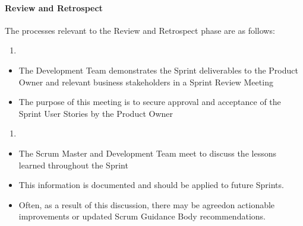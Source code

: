 \documentclass[letterpaper,10pt,english]{jupyterBook}
\begin{document}
\paragraph{Review and Retrospect}
\label{\detokenize{APM/sbok:review-and-retrospect}}
\sphinxAtStartPar
The processes relevant to the Review and Retrospect phase are as follows:
\begin{enumerate}
%
\item {} 
\sphinxAtStartPar
{}

\end{enumerate}
\begin{itemize}
\item {} 
\sphinxAtStartPar
The Development Team demonstrates the Sprint deliverables to the Product Owner and relevant business stakeholders in a Sprint Review Meeting

\item {} 
\sphinxAtStartPar
The purpose of this meeting is to secure approval and acceptance of the Sprint User Stories by the Product Owner

\end{itemize}
\begin{enumerate}
%
\setcounter{enumi}{1}
\item {} 
\sphinxAtStartPar
{}

\end{enumerate}
\begin{itemize}
\item {} 
\sphinxAtStartPar
The Scrum Master and Development Team meet to discuss the lessons learned throughout the Sprint

\item {} 
\sphinxAtStartPar
This information is documented and should be applied to future Sprints.

\item {} 
\sphinxAtStartPar
Often, as a result of this discussion, there may be agreed\sphinxhyphen{}on actionable improvements or updated Scrum Guidance Body recommendations.

\end{itemize}
\end{document}

